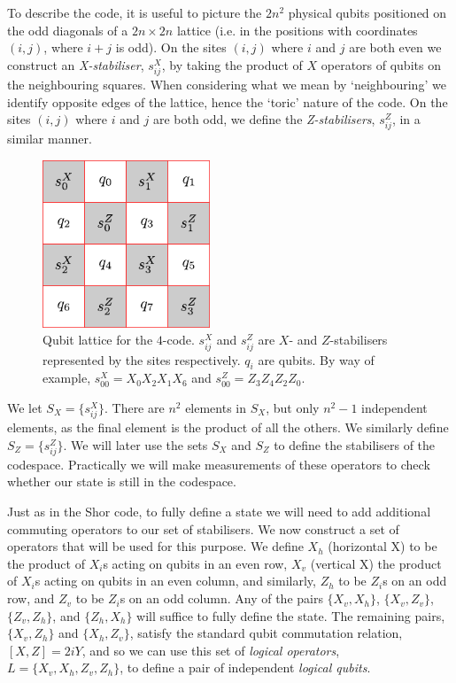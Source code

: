 To describe the code, it is useful to picture the $2n^2$ physical qubits positioned on the odd diagonals of a $2n \times 2n$ lattice (i.e. in the positions with coordinates $(i,j)$, where $i+j$ is odd). On the sites $(i, j)$ where $i$ and $j$ are both even we construct an \textit{X-stabiliser}, $s^X_{ij}$, by taking the product of $X$ operators of qubits on the neighbouring squares. When considering what we mean by `neighbouring' we identify opposite edges of the lattice, hence the `toric' nature of the code. On the sites $(i,j)$ where $i$ and $j$ are both odd, we define the \textit{Z-stabilisers}, $s^Z_{ij}$, in a similar manner.
\begin{figure}[htb]
  \begin{center}
    \includegraphics[width=5cm]{assets/4-code.pdf}
  \end{center}
  \caption{Qubit lattice for the $4$-code. $s_{ij}^X$ and $s_{ij}^Z$ are $X$- and $Z$-stabilisers represented by the sites respectively. $q_i$ are qubits. By way of example, $s_{00}^X = X_0 X_2 X_1 X_6$ and $s_{00}^Z = Z_3 Z_4 Z_2 Z_0$.}
  \label{4-code}
\end{figure}

We let $S_X = \{s^X_{ij}\}$. There are $n^2$ elements in $S_X$, but only $n^2-1$ independent elements, as the final element is the product of all the others. We similarly define $S_Z = \{s^Z_{ij}\}$. We will later use the sets $S_X$ and $S_Z$ to define the stabilisers of the codespace. Practically we will make measurements of these operators to check whether our state is still in the codespace. 

Just as in the Shor code, to fully define a state we will need to add additional commuting operators to our set of stabilisers. We now construct a set of operators that will be used for this purpose. We define $X_h$ (horizontal X) to be the product of $X_i$s acting on qubits in an even row, $X_v$ (vertical X) the product of $X_i$s acting on qubits in an even column, and similarly, $Z_h$ to be $Z_i$s on an odd row, and $Z_v$ to be $Z_i$s on an odd column. Any of the pairs $\{X_v, X_h\}$, $\{X_v, Z_v\}$, $\{Z_v, Z_h\}$, and $\{Z_h, X_h\}$ will suffice to fully define the state. The remaining pairs, $\{X_v, Z_h\}$ and $\{X_h, Z_v\}$, satisfy the standard qubit commutation relation, $[X, Z] = 2iY$, and so we can use this set of \textit{logical operators}, $L = \{X_v, X_h, Z_v , Z_h\}$, to define a pair of independent \textit{logical qubits}. 

